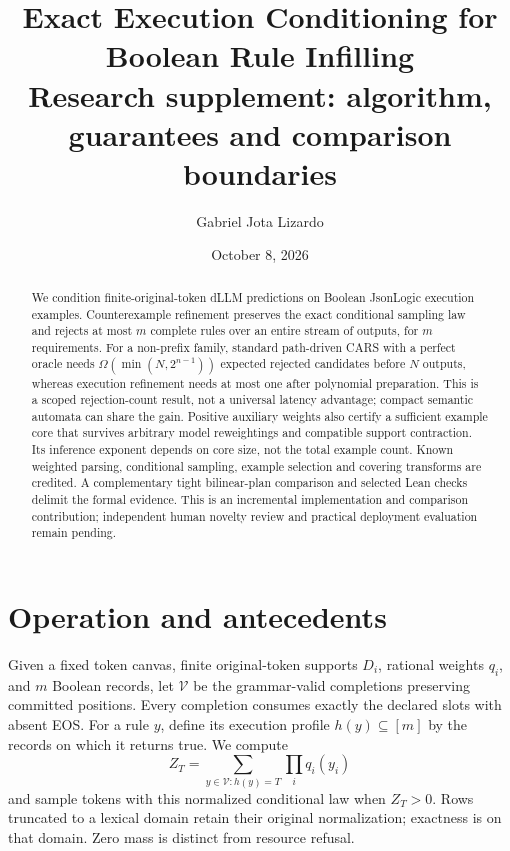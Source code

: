 \documentclass[11pt,a4paper]{article}
\title{Exact Execution Conditioning for Boolean Rule Infilling\\
\large Research supplement: algorithm, guarantees and comparison boundaries}
\author{Gabriel Jota Lizardo}
\date{October 8, 2026}
\begin{document}
\maketitle

\begin{abstract}
We condition finite-original-token dLLM predictions on Boolean JsonLogic
execution examples. Counterexample refinement preserves the exact conditional
sampling law and rejects at most $m$ complete rules over an entire stream of
outputs, for $m$ requirements. For a non-prefix family, standard path-driven
CARS with a perfect oracle needs $\Omega(\min(N,2^{n-1}))$ expected rejected
candidates before $N$ outputs, whereas execution refinement needs at most one
after polynomial preparation. This is a scoped rejection-count result, not a
universal latency advantage; compact semantic automata can share the gain.
Positive auxiliary weights also certify a sufficient example core that survives
arbitrary model reweightings and compatible support contraction. Its inference
exponent depends on core size, not the total example count. Known weighted
parsing, conditional sampling, example selection and covering transforms are
credited. A complementary tight bilinear-plan comparison and selected Lean
checks delimit the formal evidence. This is an incremental implementation and
comparison contribution; independent human novelty review and practical
deployment evaluation remain pending.
\end{abstract}

\section{Operation and antecedents}
Given a fixed token canvas, finite original-token supports $D_i$, rational
weights $q_i$, and $m$ Boolean records, let $\mathcal V$ be the grammar-valid
completions preserving committed positions. Every completion consumes exactly
the declared slots with absent EOS. For a rule $y$, define its execution
profile $h(y)\subseteq[m]$ by the records on which it returns true. We compute
\[
 Z_T=\sum_{y\in\mathcal V:h(y)=T}\prod_i q_i(y_i)
\]
and sample tokens with this normalized conditional law when $Z_T>0$.
Rows truncated to a lexical domain retain their original normalization;
exactness is on that domain. Zero mass is distinct from resource refusal.
\end{document}
